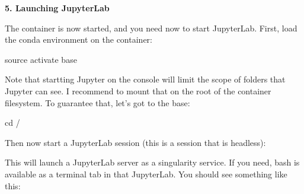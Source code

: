 \documentclass[
]{book}
\newenvironment{Shaded}{\begin{snugshade}}{\end{snugshade}}
\newcommand{\AttributeTok}[1]{\textcolor[rgb]{0.77,0.63,0.00}{#1}}
\newcommand{\BuiltInTok}[1]{#1}
\newcommand{\ExtensionTok}[1]{#1}
\newcommand{\FunctionTok}[1]{\textcolor[rgb]{0.00,0.00,0.00}{#1}}
\newcommand{\NormalTok}[1]{#1}
\newcommand{\VariableTok}[1]{\textcolor[rgb]{0.00,0.00,0.00}{#1}}
\begin{document}
\textbf{5. Launching JupyterLab}

The container is now started, and you need now to start JupyterLab. First, load the conda environment on the container:

\begin{Shaded}
\begin{Highlighting}[]
\BuiltInTok{source}\NormalTok{ activate base}
\end{Highlighting}
\end{Shaded}

Note that startting Jupyter on the console will limit the scope of folders that Jupyter can see. I recommend to mount that on the root of the container filesystem. To guarantee that, let's got to the base:

\begin{Shaded}
\begin{Highlighting}[]
\BuiltInTok{cd}\NormalTok{ /}
\end{Highlighting}
\end{Shaded}

Then now start a JupyterLab session (this is a session that is headless):

\begin{Shaded}
\end{Shaded}

This will launch a JupyterLab server as a singularity service. If you need, bash is
available as a terminal tab in that JupyterLab. You should see something like this:
\end{document}

